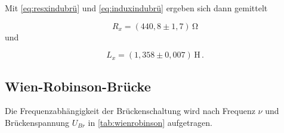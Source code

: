 Mit \eqref{eq:resxindubrü} und \eqref{eq:induxindubrü} ergeben sich dann gemittelt

\begin{equation*}
  R_x = (440,8 \pm 1,7) \,\unit{\ohm}
\end{equation*} und

\begin{equation*}
  L_x = (1,358 \pm 0,007) \,\unit{\henry} \,.
\end{equation*}

\newpage

\subsection{Wien-Robinson-Brücke}

Die Frequenzabhängigkeit der Brückenschaltung wird nach Frequenz $ν$ und Brückenspannung $U_{Br}$ in
\autoref{tab:wienrobinson} aufgetragen.

